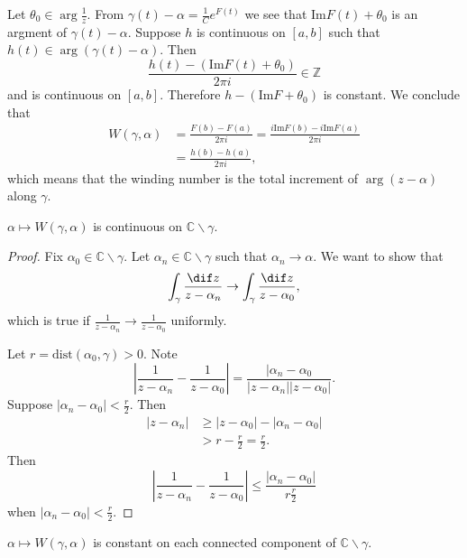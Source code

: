 \begin{remark}
Let $\theta_0 \in \arg \frac{1}{z}$. From
$\gamma(t) - \alpha = \frac{1}{C}e^{F(t)}$ we see that
$\mathrm{Im} F(t) + \theta_0$ is an argment of
$\gamma(t) - \alpha$. Suppose $h$ is continuous on
$[a, b]$ such that $h(t) \in \arg(\gamma(t) - \alpha)$.
Then
$$
\frac{h(t) - (\mathrm{Im} F(t) + \theta_0)}{2 \pi i} \in \mathbb{Z}
$$
and is continuous on $[a, b]$. Therefore
$h - (\mathrm{Im} F + \theta_0)$ is constant. We conclude that
\begin{align*}
   W(\gamma, \alpha)
&= \frac{F(b) - F(a)}{2 \pi i}
 = \frac{i \mathrm{Im} F(b) - i \mathrm{Im} F(a)}
        {2 \pi i} \\
&= \frac{h(b) - h(a)}{2 \pi i},
\end{align*}
which means that the winding number is the total increment of
$\arg (z - \alpha)$ along $\gamma$.
\end{remark}

\begin{lemma}
$\alpha \mapsto W(\gamma, \alpha)$ is continuous on
$\mathbb{C} \backslash \gamma$.
\end{lemma}

\begin{proof}
Fix $\alpha_0 \in \mathbb{C} \backslash \gamma$. Let
$\alpha_n \in \mathbb{C} \backslash \gamma$ such that
$\alpha_n \to \alpha$. We want to show that
$$
    \int_\gamma \frac{\dif z}{z - \alpha_n}
\to \int_\gamma \frac{\dif z}{z - \alpha_0},
$$
which is true if $\frac{1}{z - \alpha_n} \to \frac{1}{z - \alpha_0}$
uniformly.

Let $r = \mathrm{dist}(\alpha_0, \gamma) > 0$. Note
$$
\left|
  \frac{1}{z - \alpha_n}
- \frac{1}{z - \alpha_0}
\right|
=
\frac{|\alpha_n - \alpha_0}
     {|z - \alpha_n||z - \alpha_0|}.
$$
Suppose $|\alpha_n - \alpha_0| < \frac{r}{2}$. Then
\begin{align*}
      |z - \alpha_n|
&\geq |z - \alpha_0| - |\alpha_n - \alpha_0| \\
&>    r - \frac{r}{2} = \frac{r}{2}.
\end{align*}
Then
$$
\left|
  \frac{1}{z - \alpha_n}
- \frac{1}{z - \alpha_0}
\right|
\leq
\frac{|\alpha_n - \alpha_0|}{r \frac{r}{2}}
$$
when $|\alpha_n - \alpha_0| < \frac{r}{2}$.
\end{proof}

\begin{corol}
$\alpha \mapsto W(\gamma, \alpha)$ is constant on each connected component
of $\mathbb{C} \backslash \gamma$.
\end{corol}


